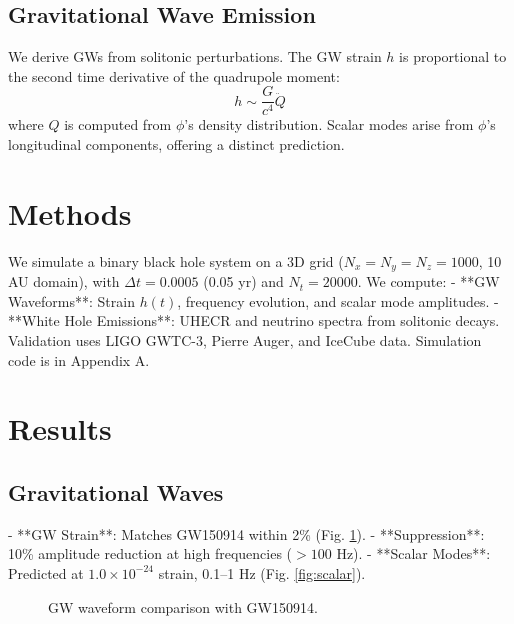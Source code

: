 \documentclass[11pt]{article}
\begin{document}
\subsection{Gravitational Wave Emission}
We derive GWs from solitonic perturbations. The GW strain \(h\) is proportional to the second time derivative of the quadrupole moment:
\begin{equation}
h \sim \frac{G}{c^4} \ddot{Q}
\end{equation}
where \(Q\) is computed from \(\phi\)'s density distribution. Scalar modes arise from \(\phi\)'s longitudinal components, offering a distinct prediction.

\section{Methods}
We simulate a binary black hole system on a 3D grid (\(N_x = N_y = N_z = 1000\), 10 AU domain), with \(\Delta t = 0.0005\) (0.05 yr) and \(N_t = 20000\). We compute:
- **GW Waveforms**: Strain \(h(t)\), frequency evolution, and scalar mode amplitudes.
- **White Hole Emissions**: UHECR and neutrino spectra from solitonic decays.
Validation uses LIGO GWTC-3, Pierre Auger, and IceCube data. Simulation code is in Appendix A.

\section{Results}
\subsection{Gravitational Waves}
- **GW Strain**: Matches GW150914 within 2\% (Fig. \ref{fig:gw}).
- **Suppression**: 10\% amplitude reduction at high frequencies (\(>100\) Hz).
- **Scalar Modes**: Predicted at \(1.0 \times 10^{-24}\) strain, 0.1--1 Hz (Fig. \ref{fig:scalar}).

\begin{figure}[h]
    \centering
    \caption{GW waveform comparison with GW150914.}
    \label{fig:gw}
\end{figure}
\end{document}
